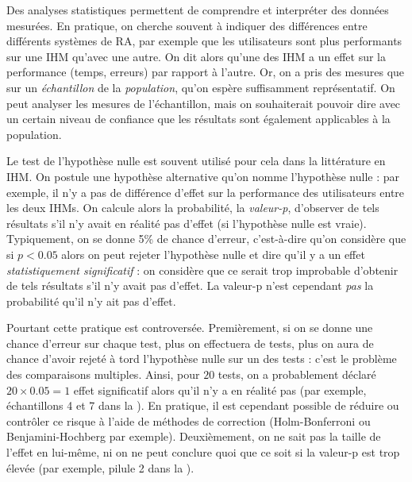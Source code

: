 Des analyses statistiques permettent de comprendre et interpréter des données mesurées. En pratique, on cherche souvent à indiquer des différences entre différents systèmes de RA, par exemple que les utilisateurs sont plus performants sur une IHM qu'avec une autre. On dit alors qu'une des IHM a un effet sur la performance (temps, erreurs) par rapport à l'autre. Or, on a pris des mesures que sur un \emph{échantillon} de la \emph{population}, qu'on espère suffisamment représentatif. On peut analyser les mesures de l'échantillon, mais on souhaiterait pouvoir dire avec un certain niveau de confiance que les résultats sont également applicables à la population.

Le test de l'hypothèse nulle est souvent utilisé pour cela dans la littérature en IHM. On postule une hypothèse alternative qu'on nomme l'hypothèse nulle : par exemple, il n'y a pas de différence d'effet sur la performance des utilisateurs entre les deux IHMs. On calcule alors la probabilité, la \emph{valeur-p}, d'observer de tels résultats s'il n'y avait en réalité pas d'effet (si l'hypothèse nulle est vraie). Typiquement, on se donne 5\% de chance d'erreur, c'est-à-dire qu'on considère que si $p < 0.05$ alors on peut rejeter l'hypothèse nulle et dire qu'il y a un effet \emph{statistiquement significatif} : on considère que ce serait trop improbable d'obtenir de tels résultats s'il n'y avait pas d'effet. La valeur-p n'est cependant \emph{pas} la probabilité qu'il n'y ait pas d'effet.


Pourtant cette pratique est controversée. Premièrement, si on se donne une chance d'erreur sur chaque test, plus on effectuera de tests, plus on aura de chance d'avoir rejeté à tord l'hypothèse nulle sur un des tests : c'est le problème des comparaisons multiples. Ainsi, pour $20$ tests, on a probablement déclaré $20 \times 0.05 = 1$ effet significatif alors qu'il n'y a en réalité pas (par exemple, échantillons 4 et 7 dans la ). En pratique, il est cependant possible de réduire ou contrôler ce risque à l'aide de méthodes de correction (Holm-Bonferroni ou Benjamini-Hochberg par exemple). Deuxièmement, on ne sait pas la taille de l'effet en lui-même, ni on ne peut conclure quoi que ce soit si la valeur-p est trop élevée (par exemple, pilule 2 dans la ).

